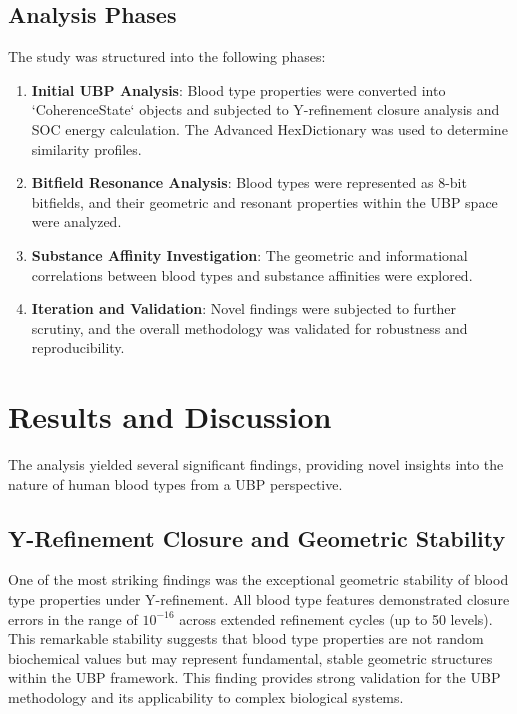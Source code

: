 \documentclass{article}
\begin{document}
\subsection{Analysis Phases}

The study was structured into the following phases:

\begin{enumerate}
    \item \textbf{Initial UBP Analysis}: Blood type properties were converted into `CoherenceState` objects and subjected to Y-refinement closure analysis and SOC energy calculation. The Advanced HexDictionary was used to determine similarity profiles.
    \item \textbf{Bitfield Resonance Analysis}: Blood types were represented as 8-bit bitfields, and their geometric and resonant properties within the UBP space were analyzed.
    \item \textbf{Substance Affinity Investigation}: The geometric and informational correlations between blood types and substance affinities were explored.
    \item \textbf{Iteration and Validation}: Novel findings were subjected to further scrutiny, and the overall methodology was validated for robustness and reproducibility.
\end{enumerate}

\section{Results and Discussion}

The analysis yielded several significant findings, providing novel insights into the nature of human blood types from a UBP perspective.

\subsection{Y-Refinement Closure and Geometric Stability}

One of the most striking findings was the exceptional geometric stability of blood type properties under Y-refinement. All blood type features demonstrated closure errors in the range of $10^{-16}$ across extended refinement cycles (up to 50 levels). This remarkable stability suggests that blood type properties are not random biochemical values but may represent fundamental, stable geometric structures within the UBP framework. This finding provides strong validation for the UBP methodology and its applicability to complex biological systems.
\end{document}
